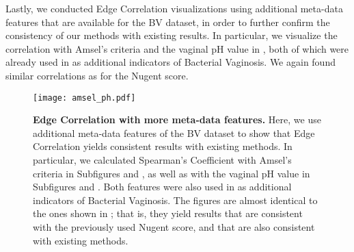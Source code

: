 Lastly, we conducted Edge Correlation visualizations using additional meta-data features
that are available for the \ac{BV} dataset,
in order to further confirm the consistency of our methods with existing results.
In particular, we visualize the correlation with Amsel's criteria \cite{Amsel1983} and the vaginal pH value
in , both of which were already used in  as additional indicators of Bacterial Vaginosis.
We again found similar correlations as for the Nugent score.


\begin{figure}[!hpbt]
    \centering
    \texttt{[image: amsel\_ph.pdf]}
    \begin{subfigure}{0pt}
        \label{fig:amsel_ph:sub:amsel_em}
    \end{subfigure}
    \begin{subfigure}{0pt}
        \label{fig:amsel_ph:sub:amsel_ei}
    \end{subfigure}
    \begin{subfigure}{0pt}
        \label{fig:amsel_ph:sub:ph_em}
    \end{subfigure}
    \begin{subfigure}{0pt}
        \label{fig:amsel_ph:sub:ph_ei}
    \end{subfigure}
    \caption[Edge Correlation with more meta-data features]{
        \textbf{Edge Correlation with more meta-data features.}
        Here, we use additional meta-data features of the \ac{BV} dataset
        to show that Edge Correlation yields consistent results with existing methods.
        In particular, we calculated Spearman's Coefficient with Amsel's criteria \cite{Amsel1983}
        in Subfigures  and ,
        as well as with the vaginal pH value
        in Subfigures  and .
        Both features were also used in  as additional indicators of Bacterial Vaginosis.
        The figures are almost identical to the ones shown in ;
        that is, they yield results that are consistent with the previously used Nugent score,
        and that are also consistent with existing methods.
    }
    \label{fig:amsel_ph}
\end{figure}

